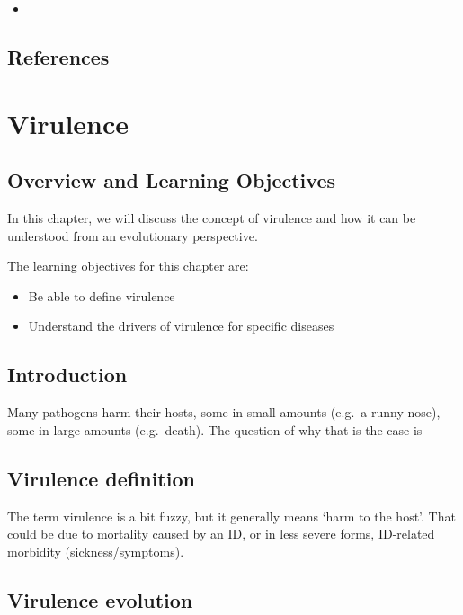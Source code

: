 \documentclass[]{book}
\providecommand{\tightlist}{%
  \setlength{\itemsep}{0pt}\setlength{\parskip}{0pt}}
\theoremstyle{definition}
\theoremstyle{definition}
\theoremstyle{definition}
\theoremstyle{remark}
\begin{document}
\begin{itemize}
\item
\end{itemize}

\section{References}\label{references-16}

\chapter{Virulence}\label{virulence}

\section{Overview and Learning
Objectives}\label{overview-and-learning-objectives-16}

In this chapter, we will discuss the concept of virulence and how it can
be understood from an evolutionary perspective.

The learning objectives for this chapter are:

\begin{itemize}
\tightlist
\item
  Be able to define virulence
\item
  Understand the drivers of virulence for specific diseases
\end{itemize}

\section{Introduction}\label{introduction-16}

Many pathogens harm their hosts, some in small amounts (e.g.~a runny
nose), some in large amounts (e.g.~death). The question of why that is
the case is

\section{Virulence definition}\label{virulence-definition}

The term virulence is a bit fuzzy, but it generally means `harm to the
host'. That could be due to mortality caused by an ID, or in less severe
forms, ID-related morbidity (sickness/symptoms).

\section{Virulence evolution}\label{virulence-evolution}
\end{document}
